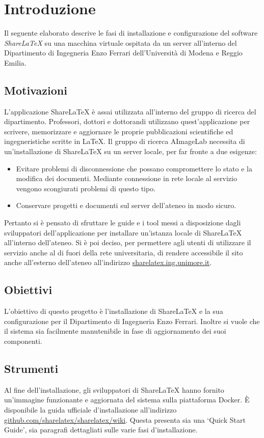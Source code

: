 \chapter{Introduzione}
\label{Introduzione}
\thispagestyle{empty}

Il seguente elaborato descrive le fasi di installazione e configurazione del software \emph{ShareLaTeX} su una macchina virtuale ospitata da un server all'interno del Dipartimento di Ingegneria Enzo Ferrari dell'Università di Modena e Reggio Emilia.

\section{Motivazioni}
L'applicazione ShareLaTeX è assai utilizzata all'interno del gruppo di ricerca del dipartimento. Professori, dottori e dottorandi utilizzano quest'applicazione per scrivere, memorizzare e aggiornare le proprie pubblicazioni scientifiche ed ingegneristiche scritte in \LaTeX. Il gruppo di ricerca AImageLab necessita di un'installazione di ShareLaTeX su un server locale, per far fronte a due esigenze:
\begin{itemize}
    \item Evitare problemi di disconnessione che possano compromettere lo stato e la modifica dei documenti. Mediante connessione in rete locale al servizio vengono scongiurati problemi di questo tipo.
    \item Conservare progetti e documenti sul server dell'ateneo in modo sicuro.
\end{itemize}
Pertanto si è pensato di sfruttare le guide e i tool messi a disposizione dagli sviluppatori dell'applicazione per installare un'istanza locale di ShareLaTeX all'interno dell'ateneo. Si è poi deciso, per permettere agli utenti di utilizzare il servizio anche al di fuori della rete universitaria, di rendere accessibile il sito anche all'esterno dell'ateneo all'indirizzo \url{sharelatex.ing.unimore.it}.

\section{Obiettivi}
L'obiettivo di questo progetto è l'installazione di ShareLaTeX e la sua configurazione per il Dipartimento di Ingegneria Enzo Ferrari. Inoltre si vuole che il sistema sia facilmente manutenibile in fase di aggiornamento dei suoi componenti.

\section{Strumenti}
Al fine dell'installazione, gli sviluppatori di ShareLaTeX hanno fornito un'immagine funzionante e aggiornata del sistema sulla piattaforma Docker. È disponibile la guida ufficiale d'installazione all'indirizzo \url{github.com/sharelatex/sharelatex/wiki}. Questa presenta sia una \enquote*{Quick Start Guide}, sia paragrafi dettagliati sulle varie fasi d'installazione.

